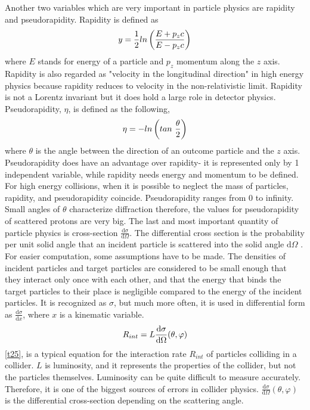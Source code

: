 \FloatBarrier
Another two variables which are very important in particle physics are rapidity and pseudorapidity. Rapidity is defined as
\begin{equation}
\centering
y=\frac{1}{2}ln\left(\frac{E + p_zc}{E - p_zc}\right)
\label{t10}
\end{equation}
where $E$ stands for energy of a particle and $p_z$ momentum along the $z$ axis. Rapidity is also regarded as "velocity in the longitudinal direction" in high energy physics because  rapidity reduces to velocity in the non-relativistic limit. Rapidity is not a Lorentz invariant but it does hold a large role in detector physics. Pseudorapidity, $\eta$, is defined as the following,
\begin{equation}
\centering
\eta = -ln\left(tan~\frac{\theta}{2}\right)
\label{t11}
\end{equation}
where $\theta$ is the angle between the direction of an outcome particle and the $z$ axis. Pseudorapidity does have an advantage over rapidity- it is represented only by 1 independent variable, while rapidity needs energy and momentum to be defined. For high energy collisions, when it is possible to neglect the mass of particles, rapidity, and pseudorapidity coincide. Pseudorapidity ranges from 0 to infinity. Small angles of $\theta$ characterize diffraction therefore, the values for pseudorapidity of scattered protons are very big. 
\newline
The last and most important quantity of particle physics is cross-section $\frac{\mathrm{d}\sigma}{\mathrm{d} \Omega}$. The differential cross section is the probability per unit solid angle that an incident particle is scattered into the solid angle $\mathrm{d}\Omega$ \cite{Krane}. For easier computation, some assumptions have to be made. The densities of incident particles and target particles are considered to be small enough that they interact only once with each other, and that the energy that binds the target particles to their place is negligible compared to the energy of the incident particles. It is recognized as $\sigma$, but much more often, it is used in differential form as $\frac{\mathrm{d} \sigma}{\mathrm{d} x}$, where $x$ is a kinematic variable.
\begin{equation}
\centering
R_{int} = L \frac{\mathrm{d} \sigma}{\mathrm{d} \Omega}(\theta, \varphi)
\label{t25}
\end{equation}
\autoref{t25}, is a typical equation for the interaction rate $R_{int}$ of particles colliding in a collider. $L$ is luminosity, and it represents the properties of the collider, but not the particles themselves. Luminosity can be quite difficult to measure accurately. Therefore, it is one of the biggest sources of errors in collider physics. $\frac{\mathrm{d} \sigma}{\mathrm{d} \Omega}(\theta, \varphi)$ is the differential cross-section depending on the scattering angle. 

